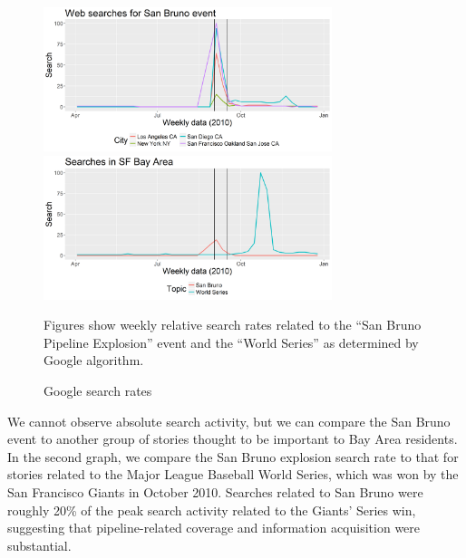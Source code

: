 \documentclass[12pt]{article}
\begin{document}
\begin{figure}[H]
\caption{Google search rates\label{fig:googletrends}}

\centering
\begin{centering}
\includegraphics[width=0.75\textwidth]{../output/google_sanbruno_cities_web.png}
\par\end{centering}
\vspace{3ex}
\begin{centering}
\includegraphics[width=0.75\textwidth]{../output/google_worldseries_web.png}
\par\end{centering}
\footnotesize Figures show weekly relative search rates related to
the ``San Bruno Pipeline Explosion'' event and the ``World Series''
as determined by Google algorithm.
\end{figure}

We cannot observe absolute search activity, but we can compare the
San Bruno event to another group of stories thought to be important
to Bay Area residents. In the second graph, we compare the San Bruno
explosion search rate to that for stories related to the Major League
Baseball World Series, which was won by the San Francisco Giants in
October 2010. Searches related to San Bruno were roughly 20\% of the
peak search activity related to the Giants' Series win, suggesting
that pipeline-related coverage and information acquisition were substantial.
\end{document}
